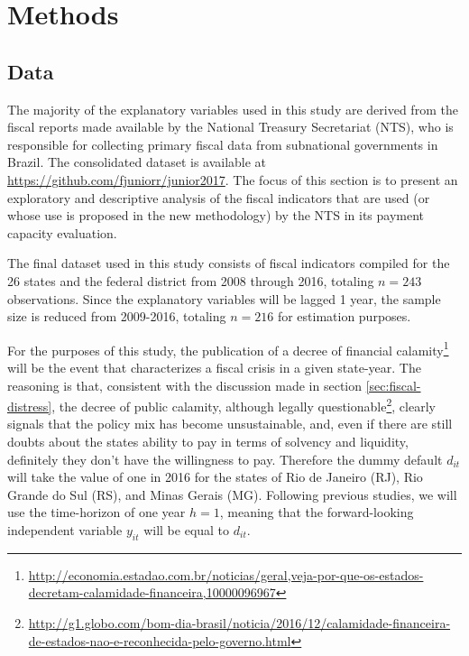 \chapter{Methods}
\label{sec:methods}

\section{Data}
\label{sec:data}

The majority of the explanatory variables used in this study are derived from the fiscal reports made available by the National Treasury Secretariat (NTS), who is responsible for collecting primary fiscal data from subnational governments in Brazil. The consolidated dataset is available at \url{https://github.com/fjuniorr/junior2017}. The focus of this section is to present an exploratory and descriptive analysis of the fiscal indicators that are used (or whose use is proposed in the new methodology) by the NTS in its payment capacity evaluation.

The final dataset used in this study consists of fiscal indicators compiled for the 26 states and the federal district from 2008 through 2016, totaling $n = 243$ observations. Since the explanatory variables will be lagged 1 year, the sample size is reduced from 2009-2016, totaling $n = 216$ for estimation purposes.

For the purposes of this study, the publication of a decree of financial calamity\footnote{\url{http://economia.estadao.com.br/noticias/geral,veja-por-que-os-estados-decretam-calamidade-financeira,10000096967}} will be the event that characterizes a fiscal crisis in a given state-year. The reasoning is that, consistent with the discussion made in section \ref{sec:fiscal-distress}, the decree of public calamity, although legally questionable\footnote{\url{http://g1.globo.com/bom-dia-brasil/noticia/2016/12/calamidade-financeira-de-estados-nao-e-reconhecida-pelo-governo.html}}, clearly signals that the policy mix has become unsustainable, and, even if there are still doubts about the states ability to pay in terms of solvency and liquidity, definitely they don't have the willingness to pay. Therefore the dummy default $d_{it}$ will take the value of one in 2016 for the states of Rio de Janeiro (RJ), Rio Grande do Sul (RS), and Minas Gerais (MG). Following previous studies, we will use the time-horizon of one year $h=1$, meaning that the forward-looking independent variable $y_{it}$ will be equal to $d_{it}$. 

